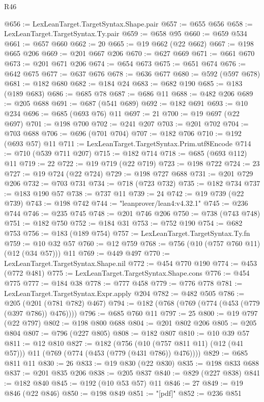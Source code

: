 \begin{lexlean}{R46}
\begin{coremodule}
@656 := LexLeanTarget.TargetSyntax.Shape.pair
@657 := @655 @656
@658 := LexLeanTarget.TargetSyntax.Ty.pair
@659 := @658 @95
@660 := @659 @534
@661 := @657 @660
@662 := 20
@665 := @19 @662 (@22 @662)
@667 := @198 @665 @206
@669 := @201 @667 @206
@670 := @627 @669
@671 := @661 @670
@673 := @201 @671 @206
@674 := @654 @673
@675 := @651 @674
@676 := @642 @675
@677 := @637 @676
@678 := @636 @677
@680 := @592 (@597 @678)
@681 := @182 @680
@682 := @184 @24
@683 := @682 @190
@685 := @183 (@189 @683)
@686 := @685 @78
@687 := @686 @11
@688 := @482 @206
@689 := @205 @688
@691 := @687 (@541 @689)
@692 := @182 @691
@693 := @10 @234
@696 := @685 (@693 @76) @11
@697 := 21
@700 := @19 @697 (@22 @697)
@701 := @198 @700
@702 := @241 @207
@703 := @201 @702
@704 := @703 @688
@706 := @696 (@701 @704)
@707 := @182 @706
@710 := @192 (@693 @57) @11
@711 := LexLeanTarget.TargetSyntax.Prim.utf8Encode
@714 := @710 (@539 @711 @207)
@715 := @182 @714
@718 := @685 (@693 @112) @11
@719 := 22
@722 := @19 @719 (@22 @719)
@723 := @198 @722
@724 := 23
@727 := @19 @724 (@22 @724)
@729 := @198 @727 @688
@731 := @201 @729 @206
@732 := @703 @731
@734 := @718 (@723 @732)
@735 := @182 @734
@737 := @183 @190 @57
@738 := @737 @11
@739 := 24
@742 := @19 @739 (@22 @739)
@743 := @198 @742
@744 := "leanprover/lean4:v4.32.1"
@745 := @236 @744
@746 := @235 @745
@748 := @201 @746 @206
@750 := @738 (@743 @748)
@751 := @182 @750
@752 := @184 @31
@753 := @752 @190
@754 := @682 @753
@756 := @183 (@189 @754)
@757 := LexLeanTarget.TargetSyntax.Ty.fn
@759 := @10 @32 @57
@760 := @12 @759
@768 := @756 (@10 (@757 @760 @11) (@12 (@34 @57))) @11
@769 := @449 @497
@770 := LexLeanTarget.TargetSyntax.Shape.nil
@772 := @454 @770 @190
@774 := @453 (@772 @481)
@775 := LexLeanTarget.TargetSyntax.Shape.cons
@776 := @454 @775
@777 := @184 @38
@778 := @777 @458
@779 := @776 @778
@781 := LexLeanTarget.TargetSyntax.Expr.apply @204
@782 := @482 @505
@786 := @205 (@201 (@781 @782) @467)
@794 := @182 (@768 (@769 (@774 (@453 (@779 (@397 @786)) @476))))
@796 := @685 @760 @11
@797 := 25
@800 := @19 @797 (@22 @797)
@802 := @198 @800 @688
@804 := @201 @802 @206
@805 := @205 @804
@807 := @796 (@227 @805)
@808 := @182 @807
@810 := @10 @39 @57
@811 := @12 @810
@827 := @182
    (@756 (@10 (@757 @811 @11) (@12 (@41 @57))) @11 (@769 (@774 (@453 (@779 (@431 @786)) @476))))
@829 := @685 @811 @11
@830 := 26
@833 := @19 @830 (@22 @830)
@835 := @198 @833 @688
@837 := @201 @835 @206
@838 := @205 @837
@840 := @829 (@227 @838)
@841 := @182 @840
@845 := @192 (@10 @53 @57) @11
@846 := 27
@849 := @19 @846 (@22 @846)
@850 := @198 @849
@851 := "[pdf]"
@852 := @236 @851

\end{coremodule}
\end{lexlean}
